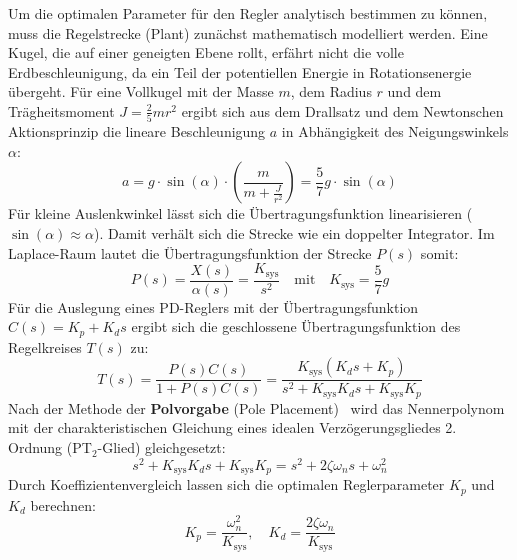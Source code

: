 \documentclass[11pt, a4paper]{scrreprt}
\begin{document}
Um die optimalen Parameter für den Regler analytisch bestimmen zu können, muss die Regelstrecke (Plant) zunächst mathematisch modelliert werden. Eine Kugel, die auf einer geneigten Ebene rollt, erfährt nicht die volle Erdbeschleunigung, da ein Teil der potentiellen Energie in Rotationsenergie übergeht. Für eine Vollkugel mit der Masse $m$, dem Radius $r$ und dem Trägheitsmoment $J = \frac{2}{5} m r^2$ ergibt sich aus dem Drallsatz und dem Newtonschen Aktionsprinzip die lineare Beschleunigung $a$ in Abhängigkeit des Neigungswinkels $\alpha$:
\begin{equation}
    a = g \cdot \sin(\alpha) \cdot \left( \frac{m}{m + \frac{J}{r^2}} \right) = \frac{5}{7} g \cdot \sin(\alpha)
\end{equation}
Für kleine Auslenkwinkel lässt sich die Übertragungsfunktion linearisieren ($\sin(\alpha) \approx \alpha$). Damit verhält sich die Strecke wie ein doppelter Integrator. Im Laplace-Raum lautet die Übertragungsfunktion der Strecke $P(s)$ somit:
\begin{equation}
    P(s) = \frac{X(s)}{\alpha(s)} = \frac{K_{\text{sys}}}{s^2} \quad \text{mit} \quad K_{\text{sys}} = \frac{5}{7}g
\end{equation}
Für die Auslegung eines PD-Reglers mit der Übertragungsfunktion $C(s) = K_p + K_d s$ ergibt sich die geschlossene Übertragungsfunktion des Regelkreises $T(s)$ zu:
\begin{equation}
    T(s) = \frac{P(s)C(s)}{1 + P(s)C(s)} = \frac{K_{\text{sys}} (K_d s + K_p)}{s^2 + K_{\text{sys}} K_d s + K_{\text{sys}} K_p}
\end{equation}
Nach der Methode der \textbf{Polvorgabe} (Pole Placement)~\cite{unbehauen2008} wird das Nennerpolynom mit der charakteristischen Gleichung eines idealen Verzögerungsgliedes 2. Ordnung (PT$_2$-Glied) gleichgesetzt:
\begin{equation}
    s^2 + K_{\text{sys}} K_d s + K_{\text{sys}} K_p = s^2 + 2\zeta\omega_n s + \omega_n^2
\end{equation}
Durch Koeffizientenvergleich lassen sich die optimalen Reglerparameter $K_p$ und $K_d$ berechnen:
\begin{equation}
    K_p = \frac{\omega_n^2}{K_{\text{sys}}}, \quad K_d = \frac{2\zeta\omega_n}{K_{\text{sys}}}
\end{equation}
\end{document}
